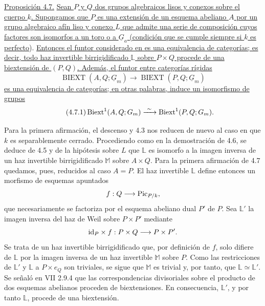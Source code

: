 
\medskip
\noindent\underline{Proposición 4.7.} \underline{Sean $P$ y $Q$ dos
grupos algebraicos lisos y conexos sobre el cuerpo $k$. Supongamos que
$P$ es una extensión de un esquema abeliano $A$ por un grupo algebraico
afín liso y conexo $L$ que admite una serie de composición cuyos
factores son isomorfos a un toro o a $\underline G_a$ (condición que se
cumple siempre si $k$ es perfecto}). \underline{Entonces el funtor considerado en
 es una equivalencia de categorías; es decir, todo haz invertible
birrigidificado $\mathbb L$ sobre $P\times Q$ procede de una
biextensión de $(P,Q)$. Además, el funtor entre categorías rígidas}
\[
 \operatorname{BIEXT}(A,Q;\underline G_m)
 \longrightarrow
 \operatorname{BIEXT}(P,Q;\underline G_m)
\]
\underline{es una equivalencia de categorías; en otras palabras,
induce un isomorfismo de grupos}
\begin{equation}\tag{4.7.1}
 \operatorname{Biext}^1(A,Q;G_m)
 \xrightarrow{\ \sim\ }
 \operatorname{Biext}^1(P,Q;G_m).
\end{equation}


Para la primera afirmación, el descenso y 4.3 nos reducen de nuevo al
caso en que $k$ es separablemente cerrado. Procediendo como en la
demostración de 4.6, se deduce de 4.5 y de la hipótesis sobre $L$ que
$\mathbb L$ es isomorfo a la imagen inversa de un haz invertible
birrigidificado $\mathbb M$ sobre $A\times Q$. Para la primera
afirmación de 4.7 quedamos, pues, reducidos al caso $A=P$. El haz
invertible $\mathbb L$ define entonces un morfismo de esquemas
apuntados
\[
 f:Q\longrightarrow\operatorname{Pic}_{P/k},
\]
que necesariamente se factoriza por el esquema abeliano dual $P'$ de
$P$. Sea $\mathbb L'$ la imagen inversa del haz de Weil sobre
$P\times P'$ mediante
\[
 \mathrm{id}_P\times f:P\times Q\longrightarrow P\times P'.
\]
Se trata de un haz invertible birrigidificado que, por definición de
$f$, solo difiere de $\mathbb L$ por la imagen inversa de un haz
invertible $\mathbb M$ sobre $P$. Como las restricciones de
$\mathbb L'$ y $\mathbb L$ a $P\times e_Q$ son triviales, se sigue que
$\mathbb M$ es trivial y, por tanto, que $\mathbb L\simeq\mathbb L'$.
Se señaló en VII 2.9.4 que las correspondencias divisoriales sobre el
producto de dos esquemas abelianos proceden de biextensiones. En
consecuencia, $\mathbb L'$, y por tanto $\mathbb L$, procede de una
biextensión.

